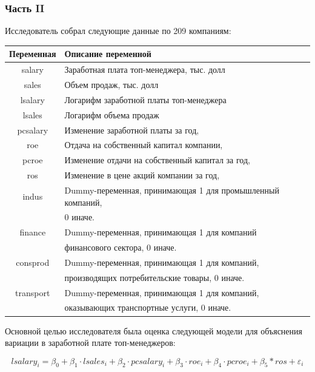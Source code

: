\subsubsection*{Часть II}

Исследователь собрал следующие данные по 209 компаниям:

\begin{tabular}{cl}
\toprule
Переменная &	Описание переменной \\
\midrule
salary & Заработная плата топ-менеджера, тыс. долл \\
sales & Объем продаж, тыс. долл \\
lsalary & Логарифм заработной платы топ-менеджера \\
lsales & Логарифм объема продаж \\
pcsalary & Изменение заработной платы за год,  \\
roe & Отдача на собственный капитал компании,   \\
pcroe & Изменение отдачи на собственный капитал за год,  \\
ros & Изменение в цене акций компании за год, \\
indus & Dummy-переменная, принимающая 1 для промышленный компаний, \\
& 0 иначе. \\
finance & Dummy-переменная, принимающая 1 для компаний \\
& финансового сектора, 0 иначе. \\
consprod & Dummy-переменная, принимающая 1 для компаний, \\
& производящих потребительские товары, 0 иначе. \\
transport & Dummy-переменная, принимающая 1 для компаний, \\
& оказывающих транспортные услуги, 0 иначе. \\
\bottomrule
\end{tabular}


Основной целью исследователя была оценка следующей модели для объяснения вариации в заработной плате топ-менеджеров:

\[
lsalary_i= \beta_0 + \beta_1 \cdot lsales_i + \beta_2 \cdot pcsalary_i + 
\beta_3 \cdot roe_i +\beta_4 \cdot pcroe_i + \beta_5*ros + \varepsilon_i
\]

